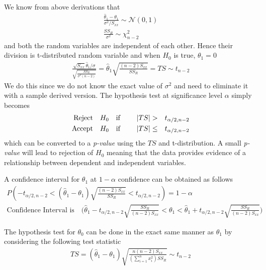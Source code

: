 \documentclass[../probability-notes.tex]{subfiles}
\begin{document}
    We know from above derivations that
    \begin{align*}
        \frac{\hat{\theta}_{1} - \theta_{1}}{\sigma^{2} / S_{xx}} \sim \mathcal{N}(0, 1)\\
        \frac{SS_{R}}{\sigma^{2}} \sim \chi_{n-2}^{2}
    \end{align*}
    and both the random variables are independent of each other. Hence their division is t-distributed random variable and when $H_{0}$ is true, $\theta_{1} = 0$
    \begin{align*}
        \frac{\sqrt{S_{xx}}\hat{\theta}_{1}/\sigma}{\sqrt{\frac{SS_{R}}{\sigma^{2} (n-2)}}} = \hat{\theta}_{1}\sqrt{\frac{(n-2)S_{xx}}{SS_{R}}} = TS \sim t_{n-2}
    \end{align*}
    We do this since we do not know the exact value of $\sigma^{2}$ and need to eliminate it with a sample derived version. The hypothesis test at significance level $\alpha$ simply becomes
    \begin{alignat*}{4}
        \text{Reject\quad} &H_{0} \text{\quad if \quad} &\lvert TS \rvert &> &t_{\alpha/2, n-2}\\
        \text{Accept\quad} &H_{0} \text{\quad if\quad} &\vert TS \rvert &\leq &t_{\alpha/2, n-2}
    \end{alignat*}
    which can be converted to a \emph{p-value} using the $TS$ and t-distribution. A small \emph{p-value} will lead to rejection of $H_{0}$ meaning that the data provides evidence of a relationship between dependent and independent variables.\newline

    A confidence interval for $\theta_{1}$ at $1-\alpha$ confidence can be obtained as follows
    \begin{gather*}
        P(-t_{\alpha/2, n-2} < (\hat{\theta}_{1} - \theta_{1})\sqrt{\frac{(n-2)S_{xx}}{SS_{R}}} < t_{\alpha/2, n-2}) = 1-\alpha\\
        \text{Confidence Interval is} \quad \bigg(\hat{\theta}_{1} - t_{\alpha/2, n-2}\sqrt{\frac{SS_{R}}{(n-2)S_{xx}}} < \theta_{1} < \hat{\theta}_{1} + t_{\alpha/2, n-2}\sqrt{\frac{SS_{R}}{(n-2)S_{xx}}} \bigg)
    \end{gather*}

    The hypothesis test for $\theta_{0}$ can be done in the exact same manner as $\theta_{1}$ by considering the following test statistic
    \begin{align*}
        TS = (\hat{\theta}_{1} - \theta_{1})\sqrt{\frac{n(n-2)S_{xx}}{(\sum_{i=1}^{n} x_{i}^{2})SS_{R}}} \sim t_{n-2}
    \end{align*}
\end{document}
